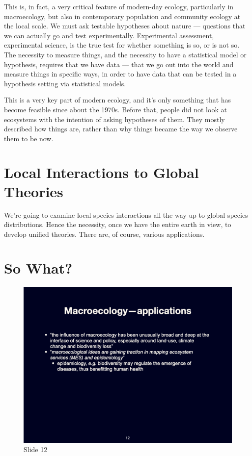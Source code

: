 \documentclass[
  10pt,
]{book}
\begin{document}
This is, in fact, a very critical feature of modern-day ecology,
particularly in macroecology, but also in contemporary population and
community ecology at the local scale. We must ask testable hypotheses
about nature --- questions that we can actually go and test
experimentally. Experimental assessment, experimental science, is the
true test for whether something is so, or is not so. The necessity to
measure things, and the necessity to have a statistical model or
hypothesis, requires that we have data --- that we go out into the world
and measure things in specific ways, in order to have data that can be
tested in a hypothesis setting via statistical models.

This is a very key part of modern ecology, and it's only something that
has become feasible since about the 1970s. Before that, people did not
look at ecosystems with the intention of asking hypotheses of them. They
mostly described how things are, rather than why things became the way
we observe them to be now.

\section{Local Interactions to Global
Theories}\label{local-interactions-to-global-theories}

We're going to examine local species interactions all the way up to
global species distributions. Hence the necessity, once we have the
entire earth in view, to develop unified theories. There are, of course,
various applications.

\section{So What?}\label{so-what}

\begin{figure}[ht]
\centering
\includegraphics[width=0.8\linewidth]{../images/BDC334/BDC334-012.jpeg}
\caption*{Slide 12}
\end{figure}
\end{document}
